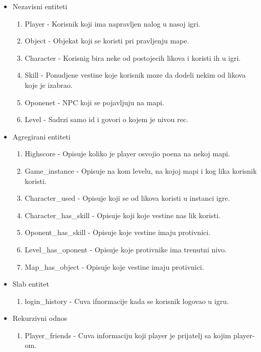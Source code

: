 \documentclass{article}
\begin{document}
\begin{itemize}
\item Nezavisni entiteti
	\begin{enumerate}
	\item Player - Korisnik koji ima napravljen nalog u nasoj igri.
	\item Object - Objekat koji se koristi pri pravljenju mape.
	\item Character - Korisnig bira neke od postojecih likova i koristi ih u igri.
	\item Skill - Ponudjene vestine koje korisnik moze da dodeli nekim od likova koje je izabrao.
	\item Oponenet - NPC koji se pojavljuju na mapi.
	\item Level - Sadrzi samo id i govori o kojem je nivou rec.
	\end{enumerate}

\item Agregirani entiteti
	\begin{enumerate}
	\item Highscore - Opisuje koliko je player osvojio poena na nekoj mapi.
	\item Game\_instance - Opisuje na kom levelu, na kojoj mapi i kog lika korisnik koristi.
	\item Character\_used - Opisuje koji se od likova koristi u instanci igre.
	\item Character\_has\_skill - Opisuje koji koje vestine nas lik koristi.
	\item Oponent\_has\_skill - Opisuje koje vestine imaju protivnici.
	\item Level\_has\_oponent - Opisuje koje protivnike ima trenutni nivo.
	\item Map\_has\_object - Opisuje koje vestine imaju protivnici.

	\end{enumerate}

\item Slab entitet
	\begin{enumerate}
	\item login\_history - Cuva ifnormacije kada se korisnik logovao u igru.
	\end{enumerate}

\item Rekurzivni odnos
	\begin{enumerate}
	\item Player\_friends - Cuva informaciju koji player je prijatelj sa kojim player-om.
	\end{enumerate}


\end{itemize}
\end{document}
